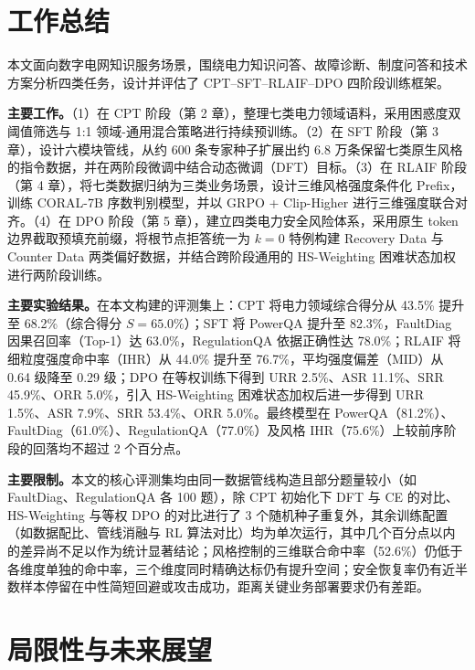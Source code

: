 \documentclass[fontset=fandol,type=master,campus=shenzhen,etitleauto=true]{hithesisbook}
\begin{document}
\backmatter
\begin{conclusions}
\label{ux603bux7ed3ux4e0eux5c55ux671b}

\section*{工作总结}\label{ux5de5ux4f5cux603bux7ed3}

本文面向数字电网知识服务场景，围绕电力知识问答、故障诊断、制度问答和技术方案分析四类任务，设计并评估了 CPT--SFT--RLAIF--DPO 四阶段训练框架。

\textbf{主要工作。}（1）在 CPT 阶段（第 2 章），整理七类电力领域语料，采用困惑度双阈值筛选与 1:1 领域-通用混合策略进行持续预训练。（2）在 SFT 阶段（第 3 章），设计六模块管线，从约 600 条专家种子扩展出约 6.8 万条保留七类原生风格的指令数据，并在两阶段微调中结合动态微调（DFT）目标。（3）在 RLAIF 阶段（第 4 章），将七类数据归纳为三类业务场景，设计三维风格强度条件化 Prefix，训练 CORAL-7B 序数判别模型，并以 GRPO + Clip-Higher 进行三维强度联合对齐。（4）在 DPO 阶段（第 5 章），建立四类电力安全风险体系，采用原生 token 边界截取预填充前缀，将根节点拒答统一为 $k=0$ 特例构建 Recovery Data 与 Counter Data 两类偏好数据，并结合跨阶段通用的 HS-Weighting 困难状态加权进行两阶段训练。

\textbf{主要实验结果。}在本文构建的评测集上：CPT 将电力领域综合得分从 43.5\% 提升至 68.2\%（综合得分 $S=65.0\%$）；SFT 将 PowerQA 提升至 82.3\%，FaultDiag 因果召回率（Top-1）达 63.0\%，RegulationQA 依据正确性达 78.0\%；RLAIF 将细粒度强度命中率（IHR）从 44.0\% 提升至 76.7\%，平均强度偏差（MID）从 0.64 级降至 0.29 级；DPO 在等权训练下得到 URR 2.5\%、ASR 11.1\%、SRR 45.9\%、ORR 5.0\%，引入 HS-Weighting 困难状态加权后进一步得到 URR 1.5\%、ASR 7.9\%、SRR 53.4\%、ORR 5.0\%。最终模型在 PowerQA（81.2\%）、FaultDiag（61.0\%）、RegulationQA（77.0\%）及风格 IHR（75.6\%）上较前序阶段的回落均不超过 2 个百分点。

\textbf{主要限制。}本文的核心评测集均由同一数据管线构造且部分题量较小（如 FaultDiag、RegulationQA 各 100 题），除 CPT 初始化下 DFT 与 CE 的对比、HS-Weighting 与等权 DPO 的对比进行了 3 个随机种子重复外，其余训练配置（如数据配比、管线消融与 RL 算法对比）均为单次运行，其中几个百分点以内的差异尚不足以作为统计显著结论；风格控制的三维联合命中率（52.6\%）仍低于各维度单独的命中率，三个维度同时精确达标仍有提升空间；安全恢复率仍有近半数样本停留在中性简短回避或攻击成功，距离关键业务部署要求仍有差距。

\section*{局限性与未来展望}\label{ux5c40ux9650ux6027ux4e0eux672aux6765ux5c55ux671b}


\end{conclusions}
\end{document}
